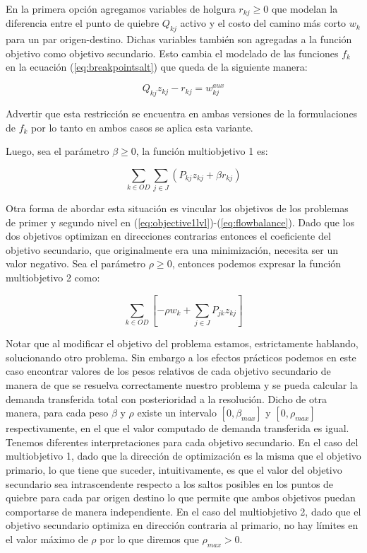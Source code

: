 En la primera opción agregamos variables de holgura $r_{kj} \geq 0$ que modelan la diferencia entre el punto de quiebre $Q_{kj}$ activo y el costo del camino más corto $w_k$ para un par origen-destino. Dichas variables también son agregadas a la función objetivo como objetivo secundario. Esto cambia el modelado de las funciones $f_k$ en la ecuación (\ref{eq:breakpointsalt}) que queda de la siguiente manera:

\begin{equation}
  \label{eq:multipleobj1breakpoint}
  Q_{kj} z_{kj} - r_{kj} = w^{aux}_{kj}
\end{equation}

Advertir que esta restricción se encuentra en ambas versiones de la formulaciones de $f_k$ por lo tanto en ambos casos se aplica esta variante.

Luego, sea el parámetro $\beta \geq 0$, la función multiobjetivo 1 es:

\begin{equation}
  \label{eq:multipleobj1}
  \sum_{k \in OD} \sum_{j \in J} \left( P_{kj}z_{kj} + \beta r_{kj} \right)
\end{equation}

Otra forma de abordar esta situación es vincular los objetivos de los problemas de primer y segundo nivel en (\ref{eq:objective1lvl})-(\ref{eq:flowbalance}). Dado que los dos objetivos optimizan en direcciones contrarias entonces el coeficiente del objetivo secundario, que originalmente era una minimización, necesita ser un valor negativo. Sea el parámetro $\rho \geq 0$, entonces podemos expresar la función multiobjetivo 2 como:

\begin{equation}
  \label{eq:multipleobj2}
  \sum_{k \in OD} \left[ -\rho w_k + \sum_{j \in J} P_{jk}z_{kj} \right]
\end{equation}

Notar que al modificar el objetivo del problema estamos, estrictamente hablando, solucionando otro problema. Sin embargo a los efectos prácticos podemos en este caso encontrar valores de los pesos relativos de cada objetivo secundario de manera de que se resuelva correctamente nuestro problema y se pueda calcular la demanda transferida total con posterioridad a la resolución. Dicho de otra manera, para cada peso $\beta$ y $\rho$ existe un intervalo $[0, \beta_{max}]$ y $[0, \rho_{max}]$ respectivamente, en el que el valor computado de demanda transferida es igual. Tenemos diferentes interpretaciones para cada objetivo secundario. En el caso del multiobjetivo 1, dado que la dirección de optimización es la misma que el objetivo primario, lo que tiene que suceder, intuitivamente, es que el valor del objetivo secundario sea intrascendente respecto a los saltos posibles en los puntos de quiebre para cada par origen destino lo que permite que ambos objetivos puedan comportarse de manera independiente. En el caso del multiobjetivo 2, dado que el objetivo secundario optimiza en dirección contraria al primario, no hay límites en el valor máximo de $\rho$ por lo que diremos que $\rho_{max} > 0$.

